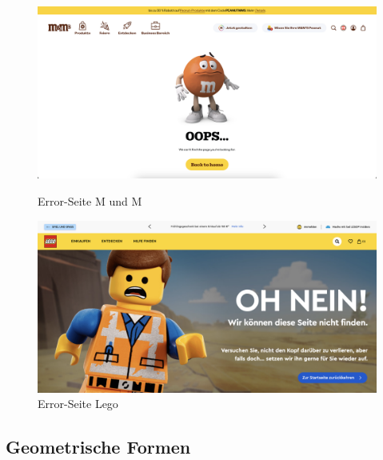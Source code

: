 \begin{figure}
   \begin{minipage}[b]{.4\linewidth} 
      \includegraphics[width=\linewidth]{pics/mundm.png}
      \caption{Error-Seite M und M}
      \label{fig:impl:error:mundm}
   \end{minipage}
   \hspace{.05\linewidth}
   \begin{minipage}[b]{.4\linewidth}
      \includegraphics[width=\linewidth]{pics/lego.png}
      \caption{Error-Seite Lego}
      \label{fig:impl:error:lego}
   \end{minipage}
\end{figure}

\subsection{Geometrische Formen}

